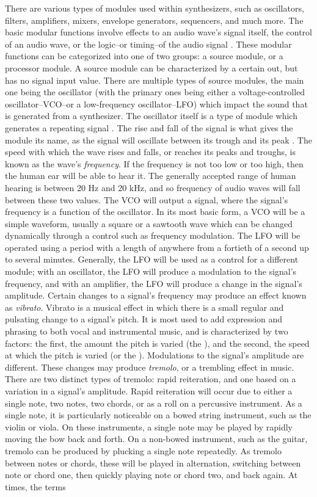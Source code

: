 There are various types of modules used within synthesizers, such as oscillators, filters, amplifiers, mixers, envelope generators, sequencers, and much more. The basic modular functions involve effects to an audio wave's signal itself, the control of an audio wave, or the logic--or timing--of the audio signal \cite{Gabrielli_2020}. These modular functions can be categorized into one of two groups: a source module, or a processor module. A source module can be characterized by a certain out, but has no signal input value. There are multiple types of source modules, the main one being the oscillator (with the primary ones being either a voltage-controlled oscillator--VCO--or a low-frequency oscillator--LFO) which impact the sound that is generated from a synthesizer. The oscillator itself is a type of module which generates a repeating signal \cite{Gabrielli_2020}. The rise and fall of the signal is what gives the module its name, as the signal will oscillate between its trough and its peak \cite{Rosen_Howell_2011}. The speed with which the wave rises and falls, or reaches its peaks and troughs, is known as the wave's \textit{frequency}. If the frequency is not too low or too high, then the human ear will be able to hear it. The generally accepted range of human hearing is between 20 Hz and 20 kHz, and so frequency of audio waves will fall between these two values. The VCO will output a signal, where the signal's frequency is a function of the oscillator. In its most basic form, a VCO will be a simple waveform, usually a square or a sawtooth wave which can be changed dynamically through a control such as frequency modulation. The LFO will be operated using a period with a length of anywhere from a fortieth of a second up to several minutes. Generally, the LFO will be used as a control for a different module; with an oscillator, the LFO will produce a modulation to the signal's frequency, and with an amplifier, the LFO will produce a change in the signal's amplitude. Certain changes to a signal's frequency may produce an effect known as \textit{vibrato}. Vibrato is a musical effect in which there is a small regular and pulsating change to a signal's pitch. It is most used to add expression and phrasing to both vocal and instrumental music, and is characterized by two factors: the first, the amount the pitch is varied (the ), and the second, the speed at which the pitch is varied (or the ). Modulations to the signal's amplitude are different. These changes may produce \textit{tremolo}, or a trembling effect in music. There are two distinct types of tremolo: rapid reiteration, and one based on a variation in a signal's amplitude. Rapid reiteration will occur due to either a single note, two notes, two chords, or as a roll on a percussive instrument. As a single note, it is particularly noticeable on a bowed string instrument, such as the violin or viola. On these instruments, a single note may be played by rapidly moving the bow back and forth. On a non-bowed instrument, such as the guitar, tremolo can be produced by plucking a single note repeatedly. As tremolo between notes or chords, these will be played in alternation, switching between note or chord one, then quickly playing note or chord two, and back again. At times, the terms 